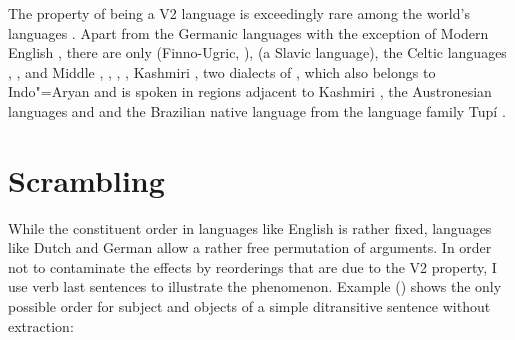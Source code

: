 The property of being a V2 language is exceedingly rare among the world's languages \citep[]{Holmberg2015a}. Apart from the Germanic languages with the exception of 
Modern English \citep{HP86a-ed}, there are only  (Finno-Ugric, \citealp[]{Holmberg2015a}),  \citep[entry~79]{Plank2003b-ed} (a Slavic language), the
Celtic languages  \citep{BK2000a-u},  \citep*[]{BTW2007a-u}, and Middle  \citep{Willis1998a-u},  \parencites[Section~1.3]{Adams1987a-u}[Section~2.1.2]{Roberts93a-u}[Chapter~2]{Vance97a-u}, 
\citep[Section~3.3.2]{Fontana97a-u}, 
 \citep{Poletto2002a-u,Anderson2006a-u}, Kashmiri
\citep[Chapter~4]{Bhatt99a-u}, two dialects of , which also belongs to Indo"=Aryan
and is spoken in regions adjacent to Kashmiri \citep{Hendriksen90a}, the Austronesian
languages  and  \citep[]{Ross2004a-u} and the Brazilian native
language  from the language family Tupí \citep{Storto2003a-u}.



\section{Scrambling}
\label{sec-phenomenon-scrambling}

While the constituent order in languages like English is rather fixed, languages like Dutch and
German allow a rather free permutation of arguments. In order not to contaminate the effects by
reorderings that are due to the V2 property, I use verb last sentences to illustrate the
phenomenon. Example () shows the only possible order for subject and objects of a simple
ditransitive sentence without extraction:


